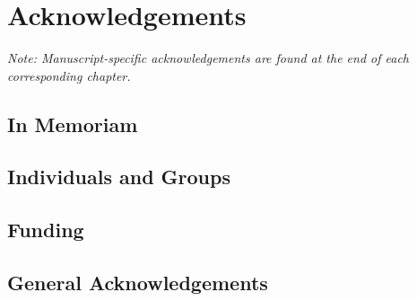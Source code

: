 \chapter*{Acknowledgements}
{}

\textit{Note: Manuscript-specific acknowledgements are found at the end of each corresponding chapter.}

\section*{In Memoriam}
\lipsum[1]

\section*{Individuals and Groups}
\lipsum[2]

\section*{Funding}
\lipsum[2]

\section*{General Acknowledgements}
\lipsum[2]
